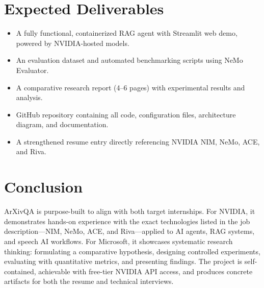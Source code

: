 \documentclass[a4paper,11pt]{article}
\begin{document}
\section{Expected Deliverables}
\begin{itemize}[noitemsep]
    \item A fully functional, containerized RAG agent with Streamlit web demo, powered by NVIDIA-hosted models.
    \item An evaluation dataset and automated benchmarking scripts using NeMo Evaluator.
    \item A comparative research report (4--6 pages) with experimental results and analysis.
    \item GitHub repository containing all code, configuration files, architecture diagram, and documentation.
    \item A strengthened resume entry directly referencing NVIDIA NIM, NeMo, ACE, and Riva.
\end{itemize}

\section{Conclusion}
ArXivQA is purpose-built to align with both target internships. For NVIDIA, it demonstrates hands-on experience with the exact technologies listed in the job description—NIM, NeMo, ACE, and Riva—applied to AI agents, RAG systems, and speech AI workflows. For Microsoft, it showcases systematic research thinking: formulating a comparative hypothesis, designing controlled experiments, evaluating with quantitative metrics, and presenting findings. The project is self-contained, achievable with free-tier NVIDIA API access, and produces concrete artifacts for both the resume and technical interviews.
\end{document}
